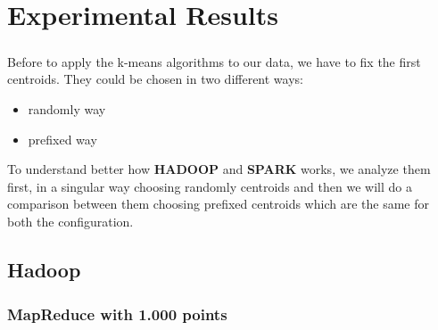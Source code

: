 \documentclass{book}
\begin{document}
\chapter{Experimental Results}\label{chap:experimental}
\paragraph{}
    Before to apply the k-means algorithms to our data, we have to fix the first centroids. They could be chosen in two different ways: 

    \begin{itemize}
        \item randomly way 
        \item prefixed way 
    \end{itemize}
        
    To understand better how \textbf{HADOOP} and \textbf{SPARK} works, we analyze them first, in a singular way choosing randomly centroids and then we will do a comparison between them choosing prefixed centroids which are the same for both the configuration. 
 
    \section{Hadoop}
    \paragraph{}

    \subsection{MapReduce with 1.000 points}
    \paragraph{}
\end{document}
